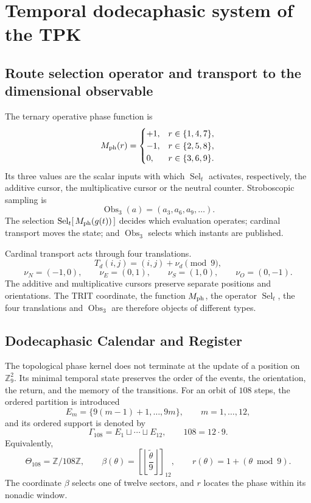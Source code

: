 \section{Temporal dodecaphasic system of the TPK}
\label{sec:ciclo-dodecafasico-tpk-rev7}


\subsection{Route selection operator and transport to the dimensional observable}

The ternary operative phase function is
\[
M_{\rm ph}(r)=
\begin{cases}
 +1,&r\in\{1,4,7\},\\
 -1,&r\in\{2,5,8\},\\
 0,&r\in\{3,6,9\}.
\end{cases}
\]
Its three values are the scalar inputs with which
\(\operatorname{Sel}_t\) activates, respectively, the additive cursor, the
multiplicative cursor or the neutral counter. Stroboscopic sampling is
\[
 \operatorname{Obs}_3(a)=(a_3,a_6,a_9,\ldots).
\]
The selection \(\operatorname{Sel}_t[\,M_{\rm ph}(g(t))\,]\) decides which
evaluation operates; cardinal transport moves the state; and
\(\operatorname{Obs}_3\) selects which instants are published.

Cardinal transport acts through four translations.
\[
 T_d(i,j)=(i,j)+\nu_d\pmod9,
\]
\[
 \nu_N=(-1,0),\qquad \nu_E=(0,1),\qquad
 \nu_S=(1,0),\qquad \nu_O=(0,-1).
\]
The additive and multiplicative cursors preserve separate positions and
orientations. The TRIT coordinate, the function \(M_{\rm ph}\), the operator
\(\operatorname{Sel}_t\), the four translations and
\(\operatorname{Obs}_3\) are therefore objects of different types.

\subsection{Dodecaphasic Calendar and Register}

The topological phase kernel does not terminate at the update of a position
on \(\mathbb Z_9^2\). Its minimal temporal state preserves the order of the
events, the orientation, the return, and the memory of the transitions. For
an orbit of \(108\) steps, the ordered partition is introduced
\[
 E_m=\{9(m-1)+1,\ldots,9m\},
 \qquad m=1,\ldots,12,
\]
and its ordered support is denoted by
\[
 \Gamma_{108}=E_1\sqcup\cdots\sqcup E_{12},
 \qquad 108=12\cdot9.
\]
Equivalently,
\[
 \Theta_{108}=\mathbb Z/108\mathbb Z,\qquad
 \beta(\theta)=
 \left[\left\lfloor\frac{\widetilde\theta}{9}\right\rfloor\right]_{12},
 \qquad
 r(\theta)=1+(\theta\bmod9).
\]
The coordinate \(\beta\) selects one of twelve sectors, and \(r\) locates the
phase within its nonadic window.

